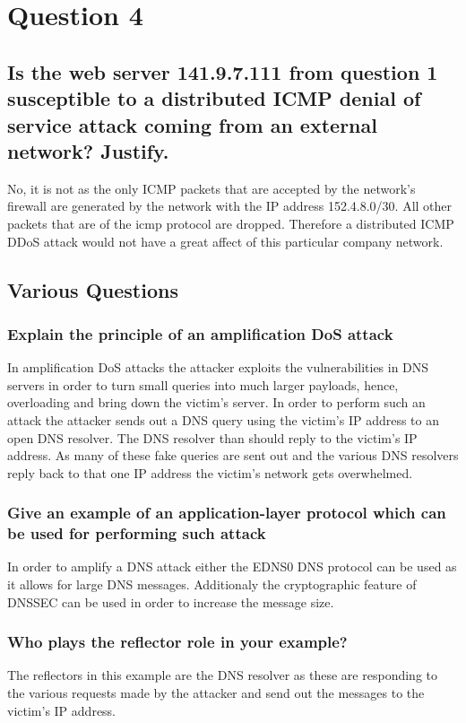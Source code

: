 \documentclass{report}
\begin{document}
	\section{Question 4}
	\startsection
		\renewcommand{\thesubsection}{\thesection.\Alph{subsection}}
		\subsection{Is the web server 141.9.7.111 from question 1 susceptible to a distributed ICMP denial of service attack coming from an external network? Justify.}
		\startsubsection
			No, it is not as the only ICMP packets that are accepted by the network's firewall are generated by the network with the IP address 152.4.8.0/30. All other packets that are of the icmp protocol are dropped. Therefore a distributed ICMP DDoS attack would not have a great affect of this particular company network.
		\closesection
		\subsection{Various Questions}
		\startsubsection
			\subsubsection{Explain the principle of an amplification DoS attack}
			\startsubsection
				In amplification DoS attacks the attacker exploits the vulnerabilities in DNS servers in order to turn small queries into much larger payloads, hence, overloading and bring down the victim's server. In order to perform such an attack the attacker sends out a DNS query using the victim's IP address to an open DNS resolver. The DNS resolver than should reply to the victim's IP address. As many of these fake queries are sent out and the various DNS resolvers reply back to that one IP address the victim's network gets overwhelmed.
			\closesection
			\subsubsection{Give an example of an application-layer protocol which can be used for performing such attack}
			\startsubsection
				In order to amplify a DNS attack either the EDNS0 DNS protocol can be used as it allows for large DNS messages. Additionaly the cryptographic feature of DNSSEC can be used in order to increase the message size.
			\closesection
			\subsubsection{Who plays the reflector role in your example?}
			\startsubsection
				The reflectors in this example are the DNS resolver as these are responding to the various requests made by the attacker and send out the messages to the victim's IP address.
			\closesection
\end{document}
